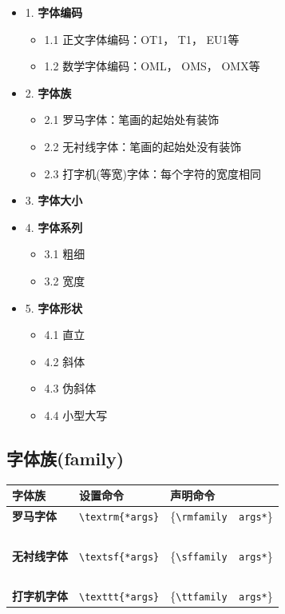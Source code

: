 \documentclass[fontset=windows, 12pt]{article}
\newcommand{\cmd}[2][\{*args\}]{\texttt{\textbackslash#2#1}}
\newcommand{\tb}[1]{\textbf{#1}}
\begin{document}
\noindent{}
\parbox[l][10em][l]{0.65\linewidth}{
\begin{itemize}
    \item 1. \textbf{字体编码}
    \begin{itemize}
        \item 1.1 正文字体编码：OT1， T1， EU1等
        \item 1.2 数学字体编码：OML， OMS， OMX等
    \end{itemize}
    \item 2. \textbf{字体族}
    \begin{itemize}
        \item 2.1 罗马字体：笔画的起始处有装饰
        \item 2.2 无衬线字体：笔画的起始处没有装饰
        \item 2.3 打字机(等宽)字体：每个字符的宽度相同
    \end{itemize}
    \item 3. \textbf{字体大小}
\end{itemize}}
\parbox[l][10em][l]{0.35\linewidth}{
\begin{itemize}
    \item 4. \textbf{字体系列}
    \begin{itemize}
        \item 3.1 粗细
        \item 3.2 宽度
    \end{itemize}
    \item 5. \textbf{字体形状}
    \begin{itemize}
        \item 4.1 直立
        \item 4.2 斜体
        \item 4.3 伪斜体
        \item 4.4 小型大写
    \end{itemize}
\end{itemize}}

\clearpage

\subsection{字体族(family)}
\begin{center}
    \begin{tabular}{p{5em}p{12em}p{12em}}
        \toprule
        \textbf {字体族} & \textbf{设置命令} & \textbf{声明命令}\\
        \hline
        \textbf{罗马字体} & \cmd{textrm} & \ttfamily\{\cmd[~~args*]{rmfamily}\} \\
        ~\\
        \tb{无衬线字体} &  \cmd{textsf} &  \ttfamily\{\cmd[~~args*]{sffamily}\} \\
        ~\\
        \tb{打字机字体} & \cmd{texttt} & \ttfamily\{\cmd[~~args*]{ttfamily}\} \\
        \bottomrule
    \end{tabular} 
\end{center}
\end{document}
